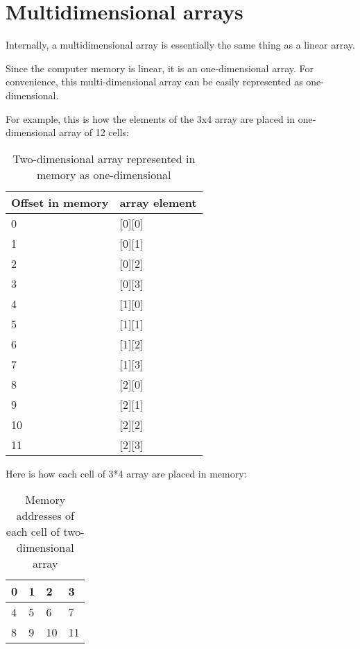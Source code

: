 \section{Multidimensional arrays}

Internally, a multidimensional array is essentially the same thing as a linear array.

Since the computer memory is linear, it is an one-dimensional array.
For convenience, this multi-dimensional array can be easily represented as one-dimensional.

For example, this is how the elements of the 3x4 array are placed in one-dimensional array of 12 cells:

\begin{table}[H]
\centering
\begin{tabular}{ | l | l | }
\hline
Offset in memory & array element \\
\hline
0 & [0][0] \\
\hline
1 & [0][1] \\
\hline
2 & [0][2] \\
\hline
3 & [0][3] \\
\hline
4 & [1][0] \\
\hline
5 & [1][1] \\
\hline
6 & [1][2] \\
\hline
7 & [1][3] \\
\hline
8 & [2][0] \\
\hline
9 & [2][1] \\
\hline
10 & [2][2] \\
\hline
11 & [2][3] \\
\hline
\end{tabular}
\caption{Two-dimensional array represented in memory as one-dimensional}
\end{table}

Here is how each cell of 3*4 array are placed in memory:

\begin{table}[H]
\centering
\begin{tabular}{ | l | l | l | l | }
\hline                        
0 & 1 & 2 & 3 \\
\hline  
4 & 5 & 6 & 7 \\
\hline  
8 & 9 & 10 & 11 \\
\hline  
\end{tabular}
\caption{Memory addresses of each cell of two-dimensional array}
\end{table}

